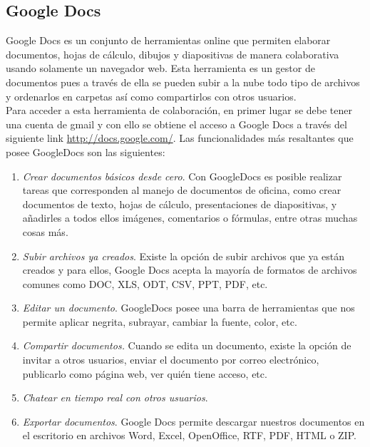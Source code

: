 \newpage
\subsection{Google Docs}

Google Docs es un conjunto de herramientas online que permiten elaborar documentos, hojas de cálculo, dibujos y diapositivas de manera colaborativa usando solamente un navegador web. Esta herramienta es un gestor de documentos pues a través de ella se pueden subir a la nube todo tipo de archivos y ordenarlos en carpetas así como compartirlos con otros usuarios.\\

Para acceder a esta herramienta de colaboración, en primer lugar se debe tener una cuenta de gmail y con ello se obtiene el acceso a Google Docs a través del siguiente link \url{http://docs.google.com/}. Las funcionalidades más resaltantes que posee GoogleDocs son las siguientes:\\

\begin{enumerate}
  \item \emph{Crear documentos básicos desde cero}. Con GoogleDocs es posible realizar tareas que corresponden al manejo de documentos de oficina, como crear documentos de texto, hojas de cálculo, presentaciones de diapositivas, y añadirles a todos ellos imágenes, comentarios o fórmulas, entre otras muchas cosas más.
  \item \emph{Subir archivos ya creados}. Existe la opción de subir archivos que ya están creados y para ellos, Google Docs acepta la mayoría de formatos de archivos comunes como DOC, XLS, ODT, CSV, PPT, PDF, etc.
  \item \emph{Editar un documento}. GoogleDocs posee una barra de herramientas que nos permite aplicar negrita, subrayar, cambiar la fuente, color, etc.
  \item \emph{Compartir documentos.} Cuando se edita un documento, existe la opción de invitar a otros usuarios, enviar el documento por correo electrónico, publicarlo como página web, ver quién tiene acceso, etc.
  \item \emph{Chatear en tiempo real con otros usuarios}.
  \item \emph{Exportar documentos}. Google Docs permite descargar nuestros documentos en el escritorio en archivos Word, Excel, OpenOffice, RTF, PDF, HTML o ZIP.
\end{enumerate}

